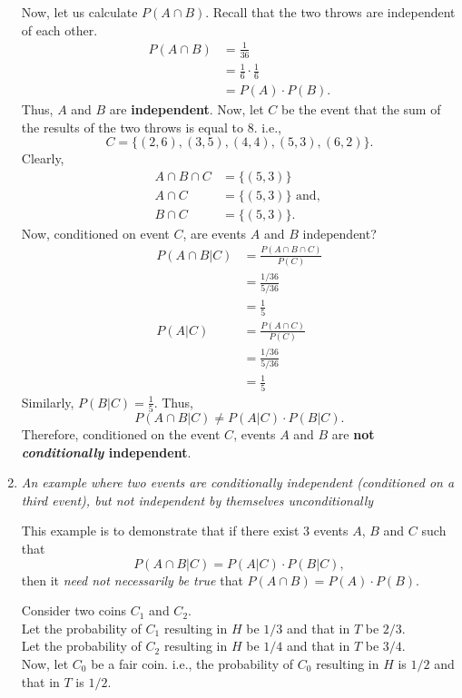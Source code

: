 \documentclass[12pt]{article}
\begin{document}
\begin{enumerate}
Now, let us calculate $P(A \cap B)$. Recall that the two throws are independent of each other.
\begin{align*}
P(A \cap B) &= \frac{1}{36}\\
&= \frac{1}{6}\cdot\frac{1}{6}\\
&= P(A)\cdot P(B).
\end{align*}
Thus, $A$ and $B$ are \textbf{independent}. Now, let $C$ be the event that the sum of the results of the two throws is equal to $8$. i.e., 
\[
C = \{(2,6),(3,5),(4,4),(5,3),(6,2)\}.
\]
Clearly, 
\begin{align*}
A \cap B \cap C &= \{(5,3)\}\\
A \cap C &= \{(5,3)\} \text{ and, }\\
B \cap C &= \{(5,3)\}.
\end{align*}
Now, conditioned on event $C$, are events $A$ and $B$ independent? 
\begin{align*}
P(A \cap B | C) &= \frac{P(A \cap B \cap C)}{P(C)}\\
&= \frac{1/36}{5/36}\\
&= \frac{1}{5} \\
P(A|C) &= \frac{P(A \cap C)}{P(C)}\\
&= \frac{1/36}{5/36}\\
&= \frac{1}{5}
\end{align*}
Similarly, $P(B|C) = \frac{1}{5}$. Thus, 
\[
P(A \cap B | C) \neq P(A|C)\cdot P(B|C).
\]
Therefore, conditioned on the event $C$, events $A$ and $B$ are \textbf{not \emph{conditionally} independent}.

\item \emph{An example where two events are conditionally independent (conditioned on a third event), but not independent by themselves unconditionally}

\par This example is to demonstrate that if there exist $3$ events $A$, $B$ and $C$ such that
\begin{equation}
P(A\cap B|C)=P(A|C)\cdot P(B|C),\nonumber
\end{equation}
then it \emph{need not necessarily be true} that $P(A\cap B)=P(A)\cdot P(B)$.

\par Consider two coins $C_1$ and $C_2$. \\Let the probability of $C_1$ resulting in $H$ be $1/3$ and that in $T$ be $2/3$. \\Let the probability of $C_2$ resulting in $H$ be $1/4$ and that in $T$ be $3/4$. \\Now, let $C_0$ be a fair coin. i.e., the probability of $C_0$ resulting in $H$ is $1/2$ and that in $T$ is $1/2$.\\


\end{enumerate}
\end{document}
